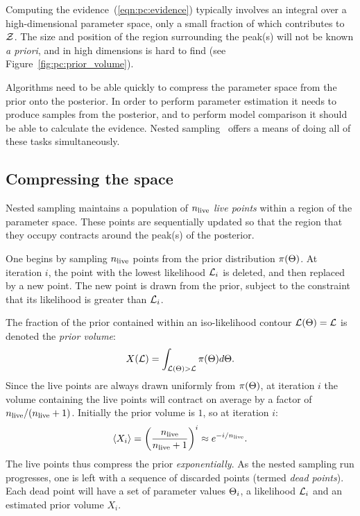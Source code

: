 Computing the evidence~(\ref{eqn:pc:evidence}) typically involves an integral over a high-dimensional parameter space, only a small fraction of which contributes to $\mathcal{Z}$. The size and position of the region surrounding the peak(s) will not be known {\em a priori}, and in high dimensions is hard to find (see Figure~\ref{fig:pc:prior_volume}).  

Algorithms need to be able quickly to compress the parameter space from the prior onto the posterior. In order to perform parameter estimation it needs to produce samples from the posterior, and to perform model comparison it should be able to calculate the evidence. 
Nested sampling~\citep{skilling2006} offers a means of doing all of these tasks simultaneously.

\subsection{Compressing the space}
\label{sec:pc:comp_space}
Nested sampling maintains a population of $n_{\mathrm{live}}$ {\em live points\/} within a region of the parameter space. These points are sequentially updated so that the region that they occupy contracts around the peak(s) of the posterior. 

One begins by sampling $n_{\mathrm{live}}$ points from the prior distribution $\pi(\Theta)$. At iteration $i$, the point with the lowest likelihood $\mathcal{L}_i$ is deleted, and then replaced by a new point. The new point is drawn from the prior, subject to the constraint that its likelihood is greater than $\mathcal{L}_i$.

The fraction of the prior contained within an iso-likelihood contour $\mathcal{L}(\Theta) = \mathcal{L}$ is denoted the {\em prior volume\/}:
%
\begin{equation}
  X(\mathcal{L}) = \int_{\mathcal{L}(\Theta)>\mathcal{L}} \pi(\Theta) d\Theta.
  \label{eqn:pc:prior_volume}
\end{equation}
%
Since the live points are always drawn uniformly from $\pi(\Theta)$, at iteration $i$ the volume containing the live points will contract on average by a factor of ${n_{\mathrm{live}}/(n_{\mathrm{live}}+1)}$. Initially the prior volume is $1$, so at iteration $i$:
\begin{equation}
  {\left\langle{X_i}\right\rangle} = {\left( \frac{n_{\mathrm{live}}}{n_{\mathrm{live}}+1} \right)}^i \approx e^{-i/n_{\mathrm{live}}}.
  \label{eqn:pc:X_full}
\end{equation}
The live points thus compress the prior {\em exponentially}. As the nested sampling run progresses, one is left with a sequence of discarded points (termed {\em dead points\/}). Each dead point will have a set of parameter values $\Theta_i$, a likelihood $\mathcal{L}_i$ and an estimated prior volume $X_i$.

